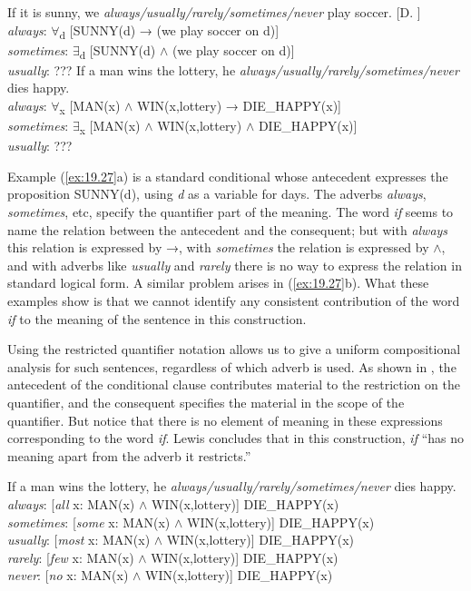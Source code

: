 \ea \label{ex:19.27}
\ea   If it is sunny, we \textit{always/usually/rarely/sometimes/never} play soccer. [D. \citealt{Lewis1975}]\\
\textit{always}: ${\forall}$\textsubscript{d} [SUNNY(d) → (we play soccer on d)]\\
\textit{sometimes}: ${\exists}$\textsubscript{d} [SUNNY(d) $\wedge$ (we play soccer on d)]\\
\textit{usually}: ???
\ex  If a man wins the lottery, he \textit{always/usually/rarely/sometimes/never} dies happy.\\
\textit{always}: ${\forall}$\textsubscript{x} [MAN(x) $\wedge$ WIN(x,lottery) → DIE\_HAPPY(x)]\\
\textit{sometimes}: ${\exists}$\textsubscript{x} [MAN(x) $\wedge$ WIN(x,lottery) $\wedge$ DIE\_HAPPY(x)]\\
\textit{usually}: ???
\z \z


Example (\ref{ex:19.27}a) is a standard conditional whose antecedent expresses the proposition SUNNY(d), using \textit{d} as a variable for days. The adverbs \textit{always}, \textit{sometimes}, etc, specify the quantifier part of the meaning. The word \textit{if} seems to name the relation between the antecedent and the consequent; but with \textit{always} this relation is expressed by →, with \textit{sometimes} the relation is expressed by $\wedge$, and with adverbs like \textit{usually} and \textit{rarely} there is no way to express the relation in standard logical form. A similar problem arises in (\ref{ex:19.27}b). What these examples show is that we cannot identify any consistent contribution of the word \textit{if} to the meaning of the sentence in this construction.



Using the restricted quantifier notation allows us to give a uniform compositional analysis for such sentences, regardless of which adverb is used. As shown in , the antecedent of the conditional clause contributes material to the restriction on the quantifier, and the consequent specifies the material in the scope of the quantifier. But notice that there is no element of meaning in these expressions corresponding to the word \textit{if}. Lewis concludes that in this construction, \textit{if} “has no meaning apart from the adverb it restricts.”


\ea \label{ex:19.28}
If a man wins the lottery, he \textit{always/usually/rarely/sometimes/never} dies happy.\\
\textit{always}:  [\textit{all} x: MAN(x) $\wedge$ WIN(x,lottery)] DIE\_HAPPY(x)\\
\textit{sometimes}:  [\textit{some} x: MAN(x) $\wedge$ WIN(x,lottery)] DIE\_HAPPY(x)\\
\textit{usually}:  [\textit{most} x: MAN(x) $\wedge$ WIN(x,lottery)] DIE\_HAPPY(x)\\
\textit{rarely}:  [\textit{few} x: MAN(x) $\wedge$ WIN(x,lottery)] DIE\_HAPPY(x)\\
\textit{never}:  [\textit{no} x: MAN(x) $\wedge$ WIN(x,lottery)] DIE\_HAPPY(x)
\z


